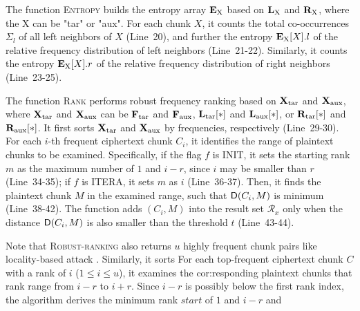 The function \textsc{Entropy} builds the entropy array $\mathbf{E}_{\rm X}$ based on $\mathbf{L}_{\rm X}$ and $\mathbf{R}_{\rm X}$, where the X can be "tar" or "aux". For each chunk $X$, it counts the total co-occurrences $\Sigma_l$ of all left neighbors of $X$ (Line~20), and further the entropy $\mathbf{E}_{\rm X}[X].l$ of the relative frequency distribution of left neighbors (Line~21-22). Similarly, it counts the entropy $\mathbf{E}_{\rm X}[X].r$ of the relative frequency distribution of right neighbors (Line~23-25).     

The function \textsc{Rank} performs robust frequency ranking based on $\mathbf{X}_{\rm tar}$ and $\mathbf{X}_{\rm aux}$, where $\mathbf{X}_{\rm tar}$ and $\mathbf{X}_{\rm aux}$ can be $\mathbf{F}_{\rm tar}$ and $\mathbf{F}_{\rm aux}$, $\mathbf{L}_{\rm tar}[*]$ and $\mathbf{L}_{\rm aux}[*]$, or $\mathbf{R}_{\rm tar}[*]$ and $\mathbf{R}_{\rm aux}[*]$. It first sorts $\mathbf{X}_{\rm tar}$ and $\mathbf{X}_{\rm aux}$ by frequencies, respectively (Line~29-30). For each $i$-th frequent ciphertext chunk $C_i$, it identifies the range of plaintext chunks to be examined. Specifically, if the flag $f$ is INIT, it sets the starting rank $m$ as the maximum number of $1$ and $i-r$, since $i$ may be smaller than $r$ (Line~34-35); if $f$ is ITERA, it sets $m$ as $i$ (Line~36-37). Then, it finds the plaintext chunk $M$ in the examined range, such that ${\sf D}(C_i, M)$ is minimum (Line~38-42). The function adds $(C_i, M)$ into the result set $\mathcal{R}_x$ only when the distance ${\sf D}(C_i, M)$ is also smaller than the threshold $t$ (Line~43-44). 


Note that \textsc{Robust-ranking} also returns $u$ highly frequent chunk pairs like locality-based attack \cite{li17}. Similarly, it sorts  For each top-frequent ciphertext chunk $C$ with a rank of $i$ ($1 \leq i \leq u$), it examines the cor:responding plaintext chunks that rank range from $i-r$ to $i+r$. Since $i-r$ is possibly below the first rank index, the algorithm derives the minimum rank $start$ of $1$ and $i-r$ and          


